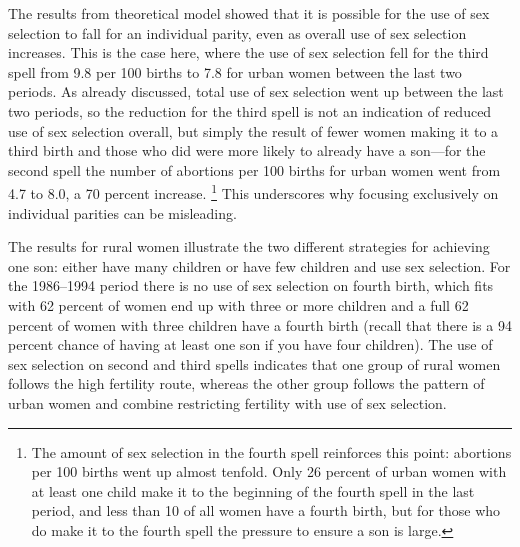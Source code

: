 \documentclass[12pt,letterpaper]{article}
\begin{document}
The results from theoretical model showed that it is possible for the use of sex 
selection to fall for an individual parity, even as overall use of sex selection 
increases. 
This is the case here, where the use of sex selection fell for the third spell 
from 9.8 per 100 births to 7.8 for urban women between the last two periods.
As already discussed, total use of sex selection went up between the last two
periods, so the reduction for the third spell is not an indication of reduced 
use of sex selection overall, but simply the result of fewer women making it to a 
third birth and those who did were more likely to already have a son---for 
the second spell the number of abortions per 100 births for urban women 
went from 4.7 to 8.0, a 70 percent increase.%
\footnote{
The amount of sex selection in the fourth spell reinforces this point:
abortions per 100 births went up almost tenfold.
Only 26 percent of urban women with at least one child make it to the beginning 
of the fourth spell in the last period, and less than 10 of all women have a fourth birth, 
but for those who do make it to the fourth spell the pressure to ensure a son is large.
}
This underscores why focusing exclusively on individual parities can be misleading.

The results for rural women illustrate the two different strategies for achieving one
son: either have many children or have few children and use sex selection.
For the 1986--1994 period there is no use of sex selection on fourth birth, which fits
with 62 percent of women end up with three or more children and a full 62 percent of women with 
three children have a fourth birth (recall that there is a 94 percent chance of having at 
least one son if you have four children).
The use of sex selection on second and third spells indicates that one group of rural
women follows the high fertility route, whereas the other group follows the pattern of
urban women and combine restricting fertility with use of sex selection.


\end{document}

